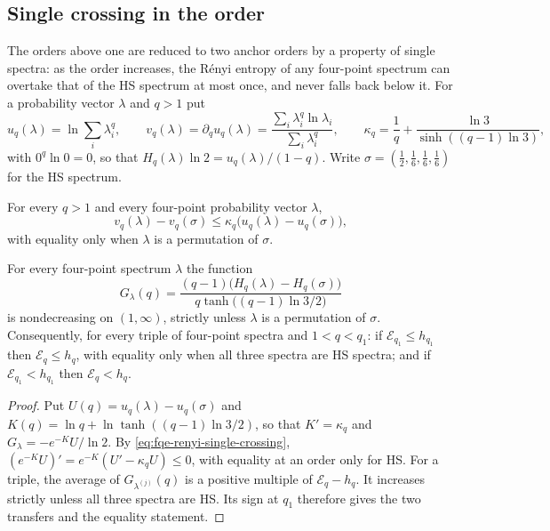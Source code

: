 \subsection{Single crossing in the order}\label{sec:fqe-renyi-single-crossing}

The orders above one are reduced to two anchor orders by a property of single spectra:
as the order increases, the R\'enyi entropy of any four-point spectrum can overtake that of the HS spectrum
at most once, and never falls back below it. For a probability vector $\lambda$ and $q>1$ put
\[
 u_q(\lambda)=\ln\sum_i\lambda_i^q,\qquad v_q(\lambda)=\partial_qu_q(\lambda)=\frac{\sum_i\lambda_i^q\ln\lambda_i}{\sum_i\lambda_i^q},
 \qquad \kappa_q=\frac1q+\frac{\ln3}{\sinh((q-1)\ln3)},
\]
with $0^q\ln0=0$, so that $H_q(\lambda)\ln2=u_q(\lambda)/(1-q)$.
Write $\sigma=(\tfrac12,\tfrac16,\tfrac16,\tfrac16)$ for the HS spectrum.

\begin{lemma}\label{lem:fqe-renyi-single-crossing}
For every $q>1$ and every four-point probability vector $\lambda$,
\[
 v_q(\lambda)-v_q(\sigma)\le\kappa_q\bigl(u_q(\lambda)-u_q(\sigma)\bigr),
 \tag{SX}\label{eq:fqe-renyi-single-crossing}
\]
with equality only when $\lambda$ is a permutation of $\sigma$.
\end{lemma}

\begin{corollary}\label{cor:fqe-renyi-order-transfer}
For every four-point spectrum $\lambda$ the function
\[
 G_\lambda(q)=\frac{(q-1)\bigl(H_q(\lambda)-H_q(\sigma)\bigr)}{q\tanh\bigl((q-1)\ln3/2\bigr)}
\]
is nondecreasing on $(1,\infty)$, strictly unless $\lambda$ is a permutation of $\sigma$.
Consequently, for every triple of four-point spectra and $1<q<q_1$:
if $\mathcal E_{q_1}\le h_{q_1}$ then $\mathcal E_q\le h_q$, with equality only when all three spectra are
HS spectra; and if $\mathcal E_{q_1}<h_{q_1}$ then $\mathcal E_q<h_q$.
\end{corollary}
\begin{proof}
Put $U(q)=u_q(\lambda)-u_q(\sigma)$ and $K(q)=\ln q+\ln\tanh((q-1)\ln3/2)$, so that $K'=\kappa_q$ and
$G_\lambda=-e^{-K}U/\ln2$. By \eqref{eq:fqe-renyi-single-crossing}, $(e^{-K}U)'=e^{-K}(U'-\kappa_qU)\le0$, with equality
at an order only for HS. For a triple, the average of $G_{\lambda^{(j)}}(q)$ is a positive multiple of
$\mathcal E_q-h_q$. It increases strictly unless all three spectra are HS.
Its sign at $q_1$ therefore gives the two transfers and the equality statement.
\end{proof}

